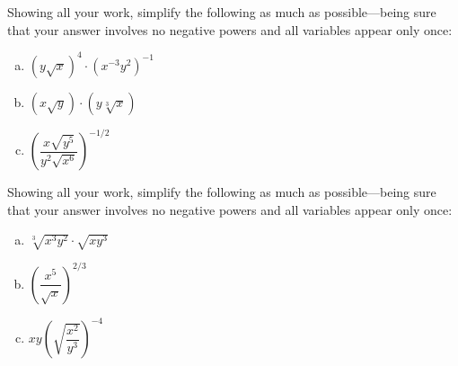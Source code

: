 \documentclass[11pt,letterpaper]{article}
\begin{document}
\newpage



 Showing all your work, simplify the following as much as possible---being sure that your answer involves no negative powers and all variables appear only once:
	\begin{enumerate}[(a)]
	\item $(y \sqrt{x})^4 \cdot (x^{-3} y^2)^{-1}$
	\item $(x \sqrt{y}) \cdot (y \sqrt[3]{x})$
	\item $\left( \dfrac{x \sqrt{y^5}}{y^2 \sqrt{x^6}} \right)^{-1/2}$
	\end{enumerate}



\newpage



 Showing all your work, simplify the following as much as possible---being sure that your answer involves no negative powers and all variables appear only once:
	\begin{enumerate}[(a)]
	\item $\sqrt[3]{x^3 y^2} \cdot \sqrt{x y^3}$
	\item $\left( \dfrac{x^5}{\sqrt{x}} \right)^{2/3}$
	\item $xy \left( \sqrt{\dfrac{x^2}{y^3}} \right)^{-4}$
	\end{enumerate}
\end{document}
